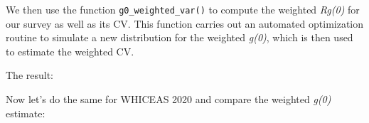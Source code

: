 \documentclass[
]{book}
\newenvironment{Shaded}{\begin{snugshade}}{\end{snugshade}}
\newcommand{\AttributeTok}[1]{\textcolor[rgb]{0.13,0.29,0.53}{#1}}
\newcommand{\CommentTok}[1]{\textcolor[rgb]{0.56,0.35,0.01}{\textit{#1}}}
\newcommand{\DecValTok}[1]{\textcolor[rgb]{0.00,0.00,0.81}{#1}}
\newcommand{\ErrorTok}[1]{\textcolor[rgb]{0.64,0.00,0.00}{\textbf{#1}}}
\newcommand{\FloatTok}[1]{\textcolor[rgb]{0.00,0.00,0.81}{#1}}
\newcommand{\FunctionTok}[1]{\textcolor[rgb]{0.13,0.29,0.53}{\textbf{#1}}}
\newcommand{\NormalTok}[1]{#1}
\newcommand{\OtherTok}[1]{\textcolor[rgb]{0.56,0.35,0.01}{#1}}
\newcommand{\SpecialCharTok}[1]{\textcolor[rgb]{0.81,0.36,0.00}{\textbf{#1}}}
\begin{document}
\begin{Shaded}
\end{Shaded}

We then use the function \texttt{g0\_weighted\_var()} to compute the weighted \emph{Rg(0)} for our survey as well as its CV. This function carries out an automated optimization routine to simulate a new distribution for the weighted \emph{g(0)}, which is then used to estimate the weighted CV.

\begin{Shaded}
\end{Shaded}

The result:

\begin{Shaded}
\end{Shaded}

Now let's do the same for WHICEAS 2020 and compare the weighted \emph{g(0)} estimate:
\end{document}
